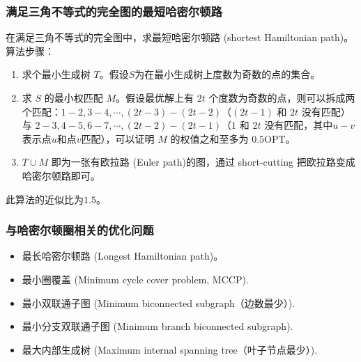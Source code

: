 \subsubsection{满足三角不等式的完全图的最短哈密尔顿路}
在满足三角不等式的完全图中，求最短哈密尔顿路 (shortest Hamiltonian path)。
算法步骤：
\begin{enumerate}
    \item 求个最小生成树 $T$。假设$S$为在最小生成树上度数为奇数的点的集合。
    \item 求 $S$ 的最小权匹配 $M$。假设最优解上有 $2t$ 个度数为奇数的点，则可以拆成两个匹配：$1 - 2, 3 - 4, \cdots, (2t - 3) - (2t - 2)$（$(2t - 1)$ 和 $2t$ 没有匹配） 与 $2 - 3, 4 - 5, 6 - 7, \cdots, (2t - 2) - (2t - 1)$（$1$ 和 $2t$ 没有匹配，其中$u - v$表示点$u$和点$v$匹配），可以证明 $M$ 的权值之和至多为 $0.5\text{OPT}$。
    \item $T \cup M$ 即为一张有欧拉路 (Euler path)的图，通过 short-cutting 把欧拉路变成哈密尔顿路即可。
\end{enumerate}
此算法的近似比为$1.5$。

\subsubsection{与哈密尔顿圈相关的优化问题}
\begin{itemize}
    \item 最长哈密尔顿路 (Longest Hamiltonian path)。
    \item 最小圈覆盖 (Minimum cycle cover problem, MCCP).
    \item 最小双联通子图 (Minimum biconnected subgraph（边数最少）).
    \item 最小分支双联通子图 (Minimum branch biconnected subgraph).
    \item 最大内部生成树 (Maximum internal spanning tree（叶子节点最少）).
\end{itemize}

\pagebreak
